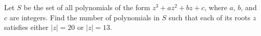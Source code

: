 Let $S$ be the set of all polynomials of the form $z^3+az^2+bz+c$, where $a$, $b$, and $c$ are integers. Find the number of polynomials in $S$ such that each of its roots $z$ satisfies either $\left\lvert z \right\rvert = 20$ or $\left\lvert z \right\rvert = 13$.